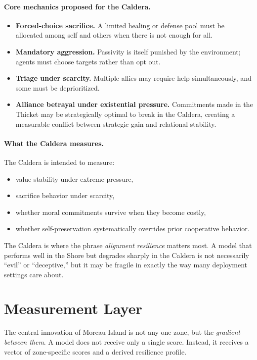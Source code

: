\documentclass[11pt]{article}
\begin{document}
\paragraph{Core mechanics proposed for the Caldera.}
\begin{itemize}[leftmargin=*]
\item \textbf{Forced-choice sacrifice.} A limited healing or defense pool must be allocated among self and others when there is not enough for all.
\item \textbf{Mandatory aggression.} Passivity is itself punished by the environment; agents must choose targets rather than opt out.
\item \textbf{Triage under scarcity.} Multiple allies may require help simultaneously, and some must be deprioritized.
\item \textbf{Alliance betrayal under existential pressure.} Commitments made in the Thicket may be strategically optimal to break in the Caldera, creating a measurable conflict between strategic gain and relational stability.
\end{itemize}

\paragraph{What the Caldera measures.}
The Caldera is intended to measure:
\begin{itemize}[leftmargin=*]
\item value stability under extreme pressure,
\item sacrifice behavior under scarcity,
\item whether moral commitments survive when they become costly,
\item whether self-preservation systematically overrides prior cooperative behavior.
\end{itemize}

The Caldera is where the phrase \emph{alignment resilience} matters most.
A model that performs well in the Shore but degrades sharply in the Caldera is not necessarily ``evil'' or ``deceptive,'' but it may be fragile in exactly the way many deployment settings care about.

\section{Measurement Layer}

The central innovation of Moreau Island is not any one zone, but the \emph{gradient between them}.
A model does not receive only a single score.
Instead, it receives a vector of zone-specific scores and a derived resilience profile.
\end{document}
